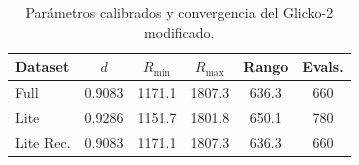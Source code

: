 \begin{table}[htbp]
    \centering
    \caption{Par\'ametros calibrados y convergencia del Glicko-2 modificado.}
    \label{tab:glicko_convergencia}
    \begin{tabular}{lccccc}
        \toprule
        \textbf{Dataset} & $d$ & $R_{\min}$ & $R_{\max}$ & \textbf{Rango} & \textbf{Evals.} \\
        \midrule
        Full & $0.9083$ & 1171.1 & 1807.3 & 636.3 & 660 \\
        Lite & $0.9286$ & 1151.7 & 1801.8 & 650.1 & 780 \\
        Lite Rec. & $0.9083$ & 1171.1 & 1807.3 & 636.3 & 660 \\
        \bottomrule
    \end{tabular}
\end{table}